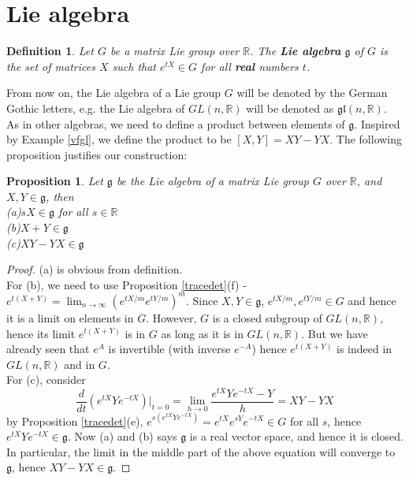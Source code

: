 \documentclass[11pt]{book}
\newtheorem{proposition}[theorem]{Proposition}
\newtheorem{definition}[theorem]{Definition}
\newcommand{\bb}[1]{\mathbb{#1}}
\newcommand{\mf}[1]{\mathfrak{#1}}
\begin{document}
\section{Lie algebra}
\begin{definition}
Let $G$ be a matrix Lie group over $\bb{R}$. The \textbf{Lie algebra} $\mf{g}$ of $G$ is the set of matrices $X$ such that $e^{tX} \in G$ for all \textbf{real} numbers $t$.
\end{definition}
From now on, the Lie algebra of a Lie group $G$ will be denoted by the German Gothic letters, e.g. the Lie algebra of $GL(n,\bb{R})$ will be denoted as $\mf{gl}(n,\bb{R})$.\\
As in other algebras, we need to define a product between elements of $\mf{g}$. Inspired by Example \ref{vfgl}, we define the product to be $[X,Y] = XY - YX$. The following proposition justifies our construction:
\begin{proposition}
Let $\mf{g}$ be the Lie algebra of a matrix Lie group $G$ over $\bb{R}$, and $X, Y \in \mf{g}$, then\\
(a)$sX \in \mf{g}$ for all $s \in \bb{R}$\\
(b)$X+Y \in \mf{g}$\\
(c)$XY - YX \in \mf{g}$
\end{proposition}
\begin{proof}
(a) is obvious from definition.\\
For (b), we need to use Proposition \ref{tracedet}(f) - $e^{t(X+Y)} = \lim_{n \to \infty}(e^{tX/m}e^{tY/m})^m$. Since $X, Y \in \mf{g}$, $e^{tX/m}, e^{tY/m} \in G$ and hence it is a limit on elements in $G$. However, $G$ is a closed subgroup of $GL(n,\bb{R})$, hence its limit $e^{t(X+Y)}$ is in $G$ as long as it is in $GL(n,\bb{R})$. But we have already seen that $e^A$ is invertible (with inverse $e^{-A}$) hence $e^{t(X+Y)}$ is indeed in $GL(n,\bb{R})$ and in $G$.\\
For (c), consider
$$\frac{d}{dt}(e^{tX}Ye^{-tX})  \Big|_{t = 0} = \lim_{h \to 0} \frac{e^{tX}Ye^{-tX} - Y}{h} = XY - YX$$
by Proposition \ref{tracedet}(e), $e^{s(e^{tX}Ye^{-tX})} = e^{tX}e^{sY}e^{-tX} \in G$ for all $s$, hence $e^{tX}Ye^{-tX} \in \mf{g}$. Now (a) and (b) says $\mf{g}$ is a real vector space, and hence it is closed. In particular, the limit in the middle part of the above equation will converge to $\mf{g}$, hence $XY - YX \in \mf{g}$.
\end{proof}
\end{document}
